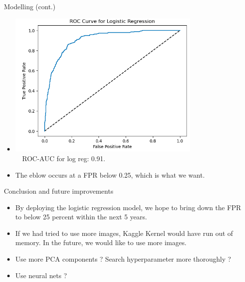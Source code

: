 \documentclass[14pt]{beamer}
\begin{document}
\begin{frame}{\small Modelling (cont.)}
\begin{itemize}
    \item \includegraphics[width=0.75\textwidth]{LogRegROC}\\~\
    ROC-AUC for log reg: 0.91.
    \item The eblow occurs at a FPR below 0.25, which is what we want.
\end{itemize}
\end{frame}

\begin{frame}{\small Conclusion and future improvements}
\begin{itemize}
    \item By deploying the logistic regression model, we hope to bring down the FPR to below 25 percent within the next 5 years.
    \item If we had tried to use more images, Kaggle Kernel would have run out of memory. In the future, we would like to use more images.
    \item Use more PCA components ? Search hyperparameter more thoroughly ?
    \item Use neural nets ?
\end{itemize}
\end{frame}
\end{document}

